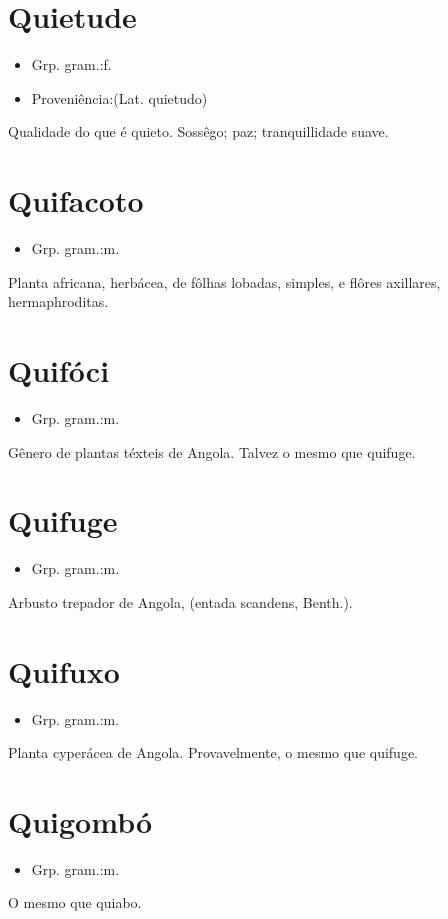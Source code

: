 \section{Quietude}
\begin{itemize}
\item {Grp. gram.:f.}
\end{itemize}
\begin{itemize}
\item {Proveniência:(Lat. \textunderscore quietudo\textunderscore )}
\end{itemize}
Qualidade do que é quieto.
Sossêgo; paz; tranquillidade suave.
\section{Quifacoto}
\begin{itemize}
\item {Grp. gram.:m.}
\end{itemize}
Planta africana, herbácea, de fôlhas lobadas, simples, e flôres axillares, hermaphroditas.
\section{Quifóci}
\begin{itemize}
\item {Grp. gram.:m.}
\end{itemize}
Gênero de plantas téxteis de Angola.
Talvez o mesmo que \textunderscore quifuge\textunderscore .
\section{Quifuge}
\begin{itemize}
\item {Grp. gram.:m.}
\end{itemize}
Arbusto trepador de Angola, (\textunderscore entada scandens\textunderscore , Benth.).
\section{Quifuxo}
\begin{itemize}
\item {Grp. gram.:m.}
\end{itemize}
Planta cyperácea de Angola.
Provavelmente, o mesmo que \textunderscore quifuge\textunderscore .
\section{Quigombó}
\begin{itemize}
\item {Grp. gram.:m.}
\end{itemize}
O mesmo que \textunderscore quiabo\textunderscore .
